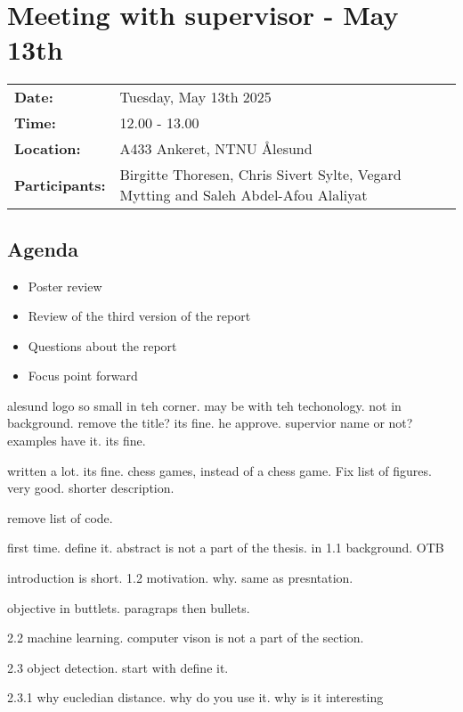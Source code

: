 \section{Meeting with supervisor - May 13th}
\begin{tabular}{ll}
    \textbf{Date:} & Tuesday, May 13th 2025 \\
    \textbf{Time:} & 12.00 - 13.00\\
    \textbf{Location:} & A433 Ankeret, NTNU Ålesund \\
    \textbf{Participants:} & Birgitte Thoresen, Chris Sivert Sylte, Vegard Mytting and Saleh Abdel-Afou Alaliyat\\
\end{tabular}

\vspace{0.5cm}

\subsection{Agenda}

\begin{itemize} 
    \item Poster review
    \item Review of the third version of the report
    \item Questions about the report
    \item Focus point forward
\end{itemize}

alesund logo so small in teh corner. may be with teh techonology. not in background. remove the title? its fine. he approve. supervior name or not? examples have it. its fine. 

written a lot. its fine. chess games, instead of a chess game. 
Fix list of figures. very good. shorter description. 

remove list of code. 

first time. define it. abstract is not a part of the thesis. in 1.1 background. OTB

introduction is short. 1.2 motivation. why. same as presntation. 

objective in buttlets. paragraps then bullets.

2.2 machine learning. computer vison is not a part of the section. 

2.3 object detection. start with define it. 

2.3.1 why eucledian distance. why do you use it. why is it interesting

